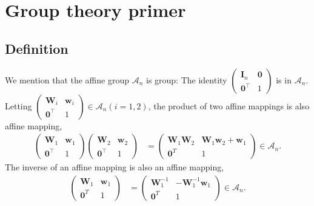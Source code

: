 \section{\label{sec:group_primer}Group theory primer}

\subsection{Definition}


We mention that the affine group $\mathcal{A}_{n}$ is group:
The identity $ \begin{pmatrix} \bm{I}_{n} & \bm{0} \\ \bm{0}^{\top} & 1 \end{pmatrix}$ is in $\mathcal{A}_{n}$.
Letting $\begin{pmatrix} \bm{W}_{i} & \bm{w}_{i} \\ \bm{0}^{\top} & 1 \end{pmatrix} \in \mathcal{A}_{n} (i=1,2)$, the product of two affine mappings is also affine mapping,
\begin{align}
  \begin{pmatrix} \bm{W}_{1} & \bm{w}_{1} \\ \bm{0}^{\top} & 1 \end{pmatrix} \begin{pmatrix} \bm{W}_{2} & \bm{w}_{2} \\ \bm{0}^{\top} & 1 \end{pmatrix}
    &=
    \begin{pmatrix}
      \bm{W}_{1} \bm{W}_{2} & \bm{W}_{1} \bm{w}_{2} + \bm{w}_{1} \\
      \bm{0}^{T} & 1
    \end{pmatrix}
    \in \mathcal{A}_{n}.
\end{align}
The inverse of an affine mapping is also an affine mapping,
\begin{align}
  \begin{pmatrix} \bm{W}_{1} & \bm{w}_{1} \\ \bm{0}^{T} & 1 \end{pmatrix}
  &=
  \begin{pmatrix} \bm{W}_{1}^{-1} & -\bm{W}_{1}^{-1}\bm{w}_{1} \\ \bm{0}^{T} & 1 \end{pmatrix} \in \mathcal{A}_{n}.
\end{align}


